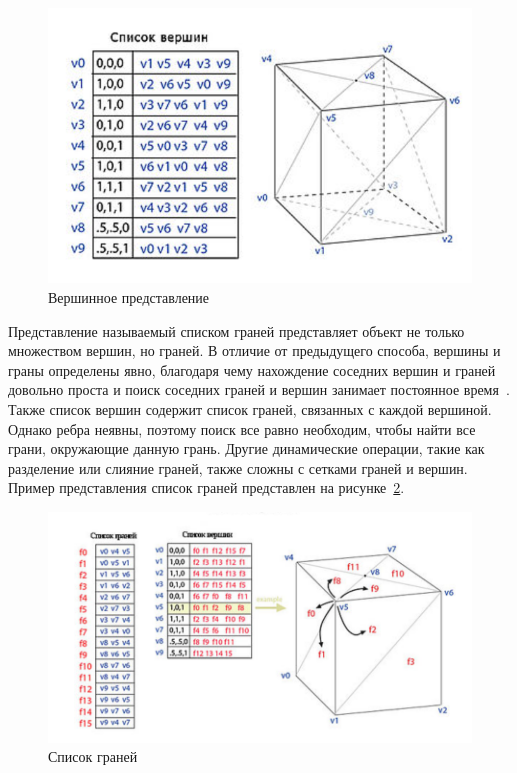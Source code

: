 \begin{figure}[h]
	\centering
	\includegraphics[height=0.3\textheight]{img/vertex-method.png}
	\caption{Вершинное представление}
	\label{img:vertex-method}
\end{figure}

Представление называемый списком граней представляет объект не только множеством вершин, но граней. 
В отличие от предыдущего способа, вершины и граны определены явно, благодаря чему нахождение соседних вершин и граней довольно проста и поиск соседних граней и вершин занимает постоянное время~\cite{aaymodelmethod}. 
Также список вершин содержит список граней, связанных с каждой вершиной. 
Однако ребра неявны, поэтому поиск все равно необходим, чтобы найти все грани, окружающие данную грань. 
Другие динамические операции, такие как разделение или слияние граней, также сложны с сетками граней и вершин. 
Пример представления список граней представлен на рисунке~\ref{img:list-faces}.

\begin{figure}[h]
	\centering
	\includegraphics[height=0.3\textheight]{img/list-faces.png}
	\caption{Список граней}
	\label{img:list-faces}
\end{figure}

